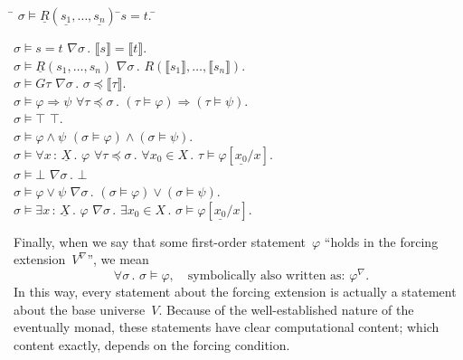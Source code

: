 \documentclass[com,11pt,crcready]{iosart2x}
\theoremstyle{definition}
\theoremstyle{plain}
\theoremstyle{remark}
\newcommand{\?}{\,{:}\,}
\newcommand{\forces}{\vDash}
\renewcommand{\_}{\mathpunct{.}\,}
\begin{document}
\begin{tabbing}
  \qquad \= $\sigma \forces \underline{R}(\underline{s_1},\ldots,\underline{s_n})$ \=  $s = t$. \= \kill

  \> $\sigma \forces s = t$
  \>  $\nabla \sigma\_ \llbracket s \rrbracket = \llbracket t \rrbracket$. \\[0.3em]

  \> $\sigma \forces \underline{R}(s_1,\ldots,s_n)$
  \>  $\nabla\sigma\_ R(\llbracket s_1 \rrbracket,\ldots,\llbracket s_n \rrbracket)$. \\[0.3em]

  \> $\sigma \forces G\tau$
  \>  $\nabla\sigma\_ \sigma \preceq \llbracket\tau\rrbracket$. \\[0.3em]

  \> $\sigma \forces \varphi \Rightarrow \psi$
  \>  $\forall \tau \preceq \sigma\_ (\tau \forces \varphi) \Rightarrow
  (\tau \forces \psi)$. \\[0.3em]

  \> $\sigma \forces \top$ \>  $\top$. \\[0.3em]

  \> $\sigma \forces \varphi \wedge \psi$
  \>  $(\sigma \forces \varphi) \wedge (\sigma \forces \psi)$. \\[0.3em]

  \> $\sigma \forces \forall x\?\underline{X}\_ \varphi$
  \>  $\forall \tau \preceq \sigma\_ \forall x_0 \in X\_ \tau \forces
  \varphi[\underline{x_0}/x]$. \\[0.3em]

  \> $\sigma \forces \bot$ \>  $\nabla\sigma\_ \bot$ \\[0.3em]

  \> $\sigma \forces \varphi \vee \psi$
  \>  $\nabla\sigma\_ (\sigma \forces \varphi) \vee (\sigma \forces \psi)$. \\[0.3em]

  \> $\sigma \forces \exists x\?\underline{X}\_ \varphi$
  \>  $\nabla\sigma\_ \exists x_0 \in X\_ \sigma \forces \varphi[\underline{x_0}/x]$.
\end{tabbing}
Finally, when we say that some first-order statement~$\varphi$ ``holds in the
forcing extension~$V^\nabla$'', we mean
\[ \forall \sigma\_ \sigma \forces \varphi,
\quad\text{symbolically also written as: $\varphi^\nabla$.} \]
In this way, every statement about the forcing extension is actually a
statement about the base universe~$V$. Because of the well-established nature
of the eventually monad, these statements have clear computational content;
which content exactly, depends on the forcing condition.
\end{document}
